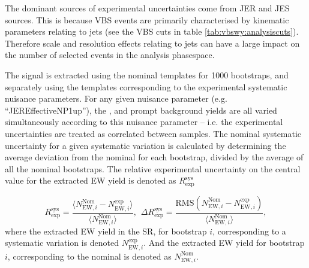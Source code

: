The dominant sources of experimental uncertainties come from JER and JES sources. This is because VBS events are primarily characterised by kinematic parameters relating to jets (see the VBS cuts in table \ref{tab:vbswy:analysiscuts}). Therefore scale and resolution effects relating to jets can have a large impact on the number of selected events in the analysis phasespace.

The signal is extracted using the nominal templates for 1000 bootstraps, and separately using the templates corresponding to the experimental systematic nuisance parameters. For any given nuisance parameter (e.g. ``JER\textunderscore EffectiveNP\textunderscore\textunderscore 1up''), the \qcdwy, \ewwy and prompt background yields are all varied simultaneously according to this nuisance parameter -- i.e. the experimental uncertainties are treated as correlated between samples. The nominal systematic uncertainty for a given systematic variation is calculated by determining the average deviation from the nominal for each bootstrap, divided by the average of all the nominal bootstraps. The relative experimental uncertainty on the central value for the extracted EW yield is denoted as $R^{\text{sys}}_{\text{exp}}$

\begin{equation}\label{eq:expunc}
  R^{\text{sys}}_{\text{exp}} = \frac{\langle N_{\text{EW},i}^{\text{Nom}}-N_{\text{EW}, i}^{\text{exp}}\rangle}{\langle N_{\text{EW},i}^{\text{Nom}}\rangle},\hspace{5pt} \Delta R^{\text{sys}}_{\text{exp}} = \frac{\text{RMS}(N_{\text{EW},i}^{\text{Nom}}-N_{\text{EW}, i}^{\text{exp}})}{\langle N_{\text{EW},i}^{\text{Nom}}\rangle},
\end{equation}
where the extracted EW yield in the SR, for bootstrap $i$, corresponding to a systematic variation is denoted $N_{\text{EW}, i}^{\text{exp}}$. And the extracted EW yield for bootstrap $i$, corresponding to the nominal is denoted as $N_{\text{EW},i}^{\text{Nom}}$.

